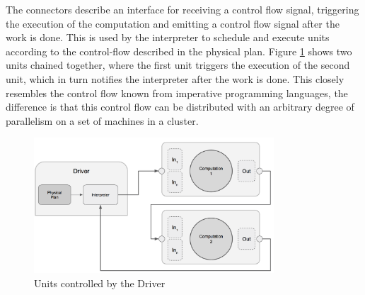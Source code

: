 The connectors describe an interface for receiving a control flow signal, triggering the execution of the computation and emitting a control flow signal after the work is done.
This is used by the interpreter to schedule and execute units according to the control-flow described in the physical plan.
Figure \ref{fig:driver_units} shows two units chained together, where the first unit triggers the execution of the second unit, which in turn notifies the interpreter after the work is done.
This closely resembles the control flow known from imperative programming languages, the difference is that this control flow can be distributed with an arbitrary degree of parallelism on a set of machines in a cluster.
\begin{figure}[ht]
\centering
\includegraphics[width=0.8\textwidth]{img/driver_units.png}
\caption{Units controlled by the Driver}
\label{fig:driver_units}
\end{figure}

